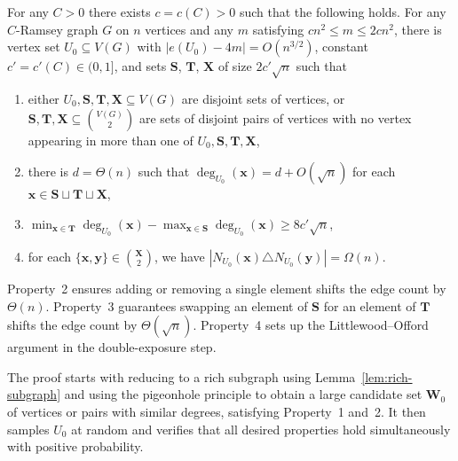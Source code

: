 \begin{lemma}
\label{lem:construction}
For any $C > 0$ there exists $c = c(C) > 0$ such that the following holds. For any $C$-Ramsey graph $G$ on $n$ vertices and any $m$ satisfying $cn^2 \leq m \leq 2cn^2$, there is vertex set $U_0 \subseteq V(G)$ with $|e(U_0) - 4m| = O(n^{3/2})$, constant $c' = c'(C) \in (0, 1]$, and sets $\mathbf{S}$, $\mathbf{T}$, $\mathbf{X}$ of size $2c'\sqrt{n}$ such that
\begin{enumerate}
  \item either $U_0, \mathbf{S}, \mathbf{T}, \mathbf{X} \subseteq V(G)$ are disjoint sets of vertices, or $\mathbf{S}, \mathbf{T}, \mathbf{X} \subseteq \binom{V(G)}{2}$ are sets of disjoint pairs of vertices with no vertex appearing in more than one of $U_0, \mathbf{S}, \mathbf{T}, \mathbf{X}$,
  \item there is $d = \Theta(n)$ such that $\deg_{U_0}(\mathbf{x}) = d + O(\sqrt{n})$ for each $\mathbf{x} \in \mathbf{S} \sqcup \mathbf{T} \sqcup \mathbf{X}$,
  \item $\min_{\mathbf{x} \in \mathbf{T}} \deg_{U_0}(\mathbf{x}) - \max_{\mathbf{x} \in \mathbf{S}} \deg_{U_0}(\mathbf{x}) \geq 8c'\sqrt{n}$,
  \item for each $\{\mathbf{x}, \mathbf{y}\} \in \binom{\mathbf{X}}{2}$, we have $|N_{U_0}(\mathbf{x}) \triangle N_{U_0}(\mathbf{y})| = \Omega(n)$.
\end{enumerate}
\end{lemma}

Property~2 ensures adding or removing a single element shifts the edge count by $\Theta(n)$. Property~3 guarantees swapping an element of $\mathbf{S}$ for an element of $\mathbf{T}$ shifts the edge count by $\Theta(\sqrt{n})$. Property~4 sets up the Littlewood--Offord argument in the double-exposure step. 

The proof starts with reducing to a rich subgraph using Lemma~\ref{lem:rich-subgraph} and using the pigeonhole principle to obtain a large candidate set $\mathbf{W}_0$ of vertices or pairs with similar degrees, satisfying Property~1 and~2. It then samples $U_0$ at random and verifies that all desired properties hold simultaneously with positive probability.

